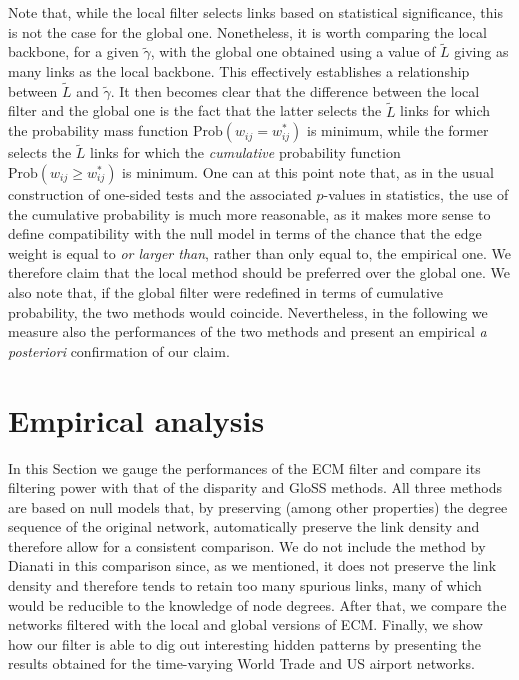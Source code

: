 \documentclass[aps,twocolumn,superscriptaddress]{revtex4-1}
\newcommand{\gloss}{GloSS }
\begin{document}
Note that, while the local filter selects links based on statistical significance, this is not the case for the global one. Nonetheless, it is worth comparing the local backbone, for a given $\widetilde{\gamma}$, with the global one obtained using a value of $\widetilde{L}$ giving as many links as the local backbone.
This effectively establishes a relationship between $\widetilde{L}$ and $\widetilde{\gamma}$.
It then becomes clear that the difference between the local filter and the global one is the fact that the latter selects the $\widetilde{L}$ links for which the probability mass function $\textrm{Prob}(w_{ij} =w_{ij}^{\ast})$ is minimum, while the former selects the $\widetilde{L}$ links for which the \emph{cumulative} probability function $\textrm{Prob}(w_{ij} \ge w^\ast_{ij})$ is minimum. 
One can at this point note that, as in the usual construction of one-sided tests and the associated $p$-values in statistics, the use of the cumulative probability is much more reasonable, as it makes more sense to define compatibility with the null model in terms of the chance that the edge weight is equal to \emph{or larger than}, rather than only equal to, the empirical one.
We therefore claim that the local method should be preferred over the global one.
We also note that, if the global filter were redefined in terms of cumulative probability, the two methods would coincide. Nevertheless, in the following we measure also the performances of the two methods and present an empirical \emph{a posteriori} confirmation of our claim.

\section{Empirical analysis\label{sec:results}}

In this Section we gauge the performances of the ECM filter and compare its filtering power with that of the disparity and \gloss methods. All three methods are based on null models that, by preserving (among other properties) the degree sequence of the original network, automatically preserve the link density and therefore allow for a consistent comparison. 
We do not include the method by Dianati in this comparison since, as we mentioned, it does not preserve the link density and therefore tends to retain too many spurious links, many of which would be reducible to the knowledge of node degrees. After that, we compare the networks filtered with the local and global versions of ECM. Finally, we show how our filter is able to dig out interesting hidden patterns by presenting the results obtained for the time-varying World Trade and US airport networks.
\end{document}
